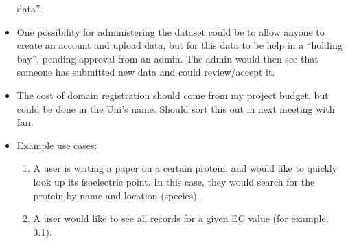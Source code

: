 \begin{itemize}
  data''.
\item One possibility for administering the dataset could be to allow anyone to
  create an account and upload data, but for this data to be help in a ``holding
  bay'', pending approval from an admin. The admin would then see that someone
  has submitted new data and could review/accept it.
\item The cost of domain registration should come from my project budget, but
  could be done in the Uni's name. Should sort this out in next meeting with
  Ian.
\item Example use cases:
  \begin{enumerate}
    \item A user is writing a paper on a certain protein, and would like to
      quickly look up its isoelectric point. In this case, they would search for
      the protein by name and location (species).
    \item A user would like to see all records for a given EC value (for
      example, 3.1).
  \end{enumerate}
\end{itemize}
